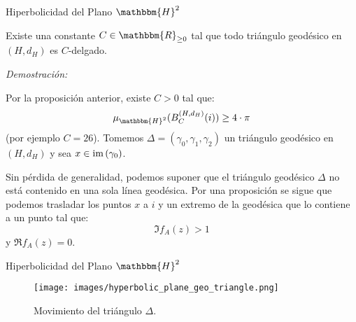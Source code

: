 \documentclass[xcolor=dvipsnames]{beamer}
\theoremstyle{largebreak}
\newcommand{\bbm}[1]{\ensuremath{\mathbbm{#1}}}
\newcommand{\im}[1]{\ensuremath{\textup{im}\left(#1\right)}}
\begin{document}
\begin{frame}{Hiperbolicidad del Plano $\bbm{H}^2$}
    \begin{theor}
        Existe una constante $C\in\bbm{R}_{\geq0}$ tal que todo triángulo geodésico en $(H,d_H)$ es $C$-delgado.
    \end{theor}

    \textit{Demostración:}

    Por la proposición anterior, existe $C>0$ tal que:
    \begin{equation*}
        \mu_{\bbm{H}^2}(B_C^{(H,d_H)}(i))\geq 4\cdot\pi
    \end{equation*}
    (por ejemplo $C=26$). Tomemos $\Delta=(\gamma_0,\gamma_1,\gamma_2)$ un triángulo geodésico en $(H,d_H)$ y sea $x\in\im{\gamma_0}$.

    Sin pérdida de generalidad, podemos suponer que el triángulo geodésico $\Delta$ no está contenido en una sola línea geodésica. Por una proposición se sigue que podemos trasladar los puntos $x$ a $i$ y un extremo de la geodésica que lo contiene a un punto tal que:
    \begin{equation*}
        \Im f_A(z)>1
    \end{equation*}
    y $\Re f_A(z)=0$.
\end{frame}

\begin{frame}{Hiperbolicidad del Plano $\bbm{H}^2$}
    \begin{figure}
        \begin{center}
            \texttt{[image: images/hyperbolic\_plane\_geo\_triangle.png]}
        \end{center}
        \caption{Movimiento del triángulo $\Delta$.}
    \end{figure}
\end{frame}
\end{document}
